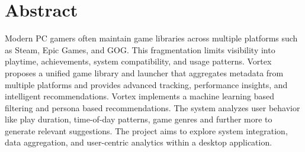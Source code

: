 \section*{Abstract}
Modern PC gamers often maintain game libraries across multiple platforms such as Steam, Epic Games, and GOG. 
This fragmentation limits visibility into playtime, achievements, system compatibility, and usage patterns.
Vortex proposes a unified game library and launcher that aggregates metadata from multiple platforms and provides
advanced tracking, performance insights, and intelligent recommendations.
Vortex implements a machine learning based filtering and persona based recommendations. The system analyzes user behavior like play duration, time-of-day patterns, game genres and further more to generate relevant suggestions.
The project aims to explore system integration, data aggregation, and user-centric analytics within a desktop application.

